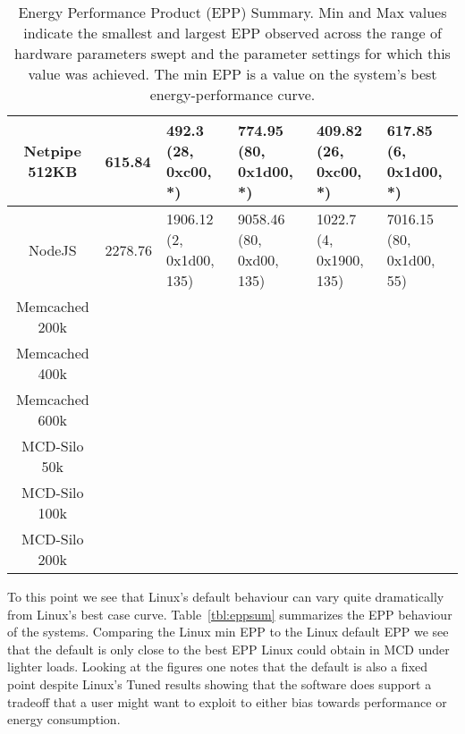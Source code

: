 \begin{table*}[h]
\begin{tabular}{|c||l||l|l||l|l|}
Netpipe 512KB                                                                       &           615.84                     &   492.3 (28, 0xc00, *)              &     774.95 (80, 0x1d00, *)           &     409.82 (26, 0xc00, *)          &    617.85 (6, 0x1d00, *)         \\ \hline \hline

NodeJS                                                                             &           2278.76                         &   1906.12 (2, 0x1d00, 135)              &    9058.46 (80, 0xd00, 135)            &   1022.7 (4, 0x1900, 135)           &    7016.15 (80, 0x1d00, 55)         \\ \hline \hline
Memcached 200k                                                                     &                                    &                 &                &              &             \\ \hline
Memcached 400k                                                                     &                                    &                 &                &              &             \\ \hline  \hline
Memcached 600k                                                                     &                                    &                 &                &              &             \\ \hline
MCD-Silo 50k                                                                       &                                    &                 &                &              &             \\ \hline
MCD-Silo 100k                                                                      &                                    &                 &                &              &             \\ \hline
MCD-Silo 200k                                                                      &                                    &                 &                &              &             \\ \hline  \hline
\end{tabular}
\caption{Energy Performance Product (EPP) Summary. Min and Max values indicate the smallest and largest EPP observed across the range of hardware parameters swept and the parameter settings for which this value was achieved.  The min EPP is a value on the system's best energy-performance curve.}
\label{table:eppsum}
\end{table*}

To this point we see that Linux's default behaviour can vary quite dramatically  from Linux's best case curve.  Table~\ref{tbl:eppsum} summarizes the EPP behaviour of the systems.  Comparing the Linux min EPP to the Linux default EPP we see that the default is only close to the best EPP Linux could obtain in MCD under lighter loads.  Looking at the figures one notes that the default is also a fixed point  despite Linux's Tuned results showing that the software  does support a  tradeoff that a user might want to exploit to either bias towards performance or energy consumption.


